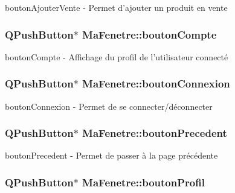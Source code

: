 bouton\-Ajouter\-Vente -\/ Permet d'ajouter un produit en vente 

\hypertarget{class_ma_fenetre_abfdb548dc88cf56eae01fd20be7b052a}{
\subsubsection[{bouton\-Compte}]{\setlength{\rightskip}{0pt plus 5cm}Q\-Push\-Button$\ast$ Ma\-Fenetre\-::bouton\-Compte\hspace{0.3cm}{\ttfamily [protected]}}}\label{class_ma_fenetre_abfdb548dc88cf56eae01fd20be7b052a}


bouton\-Compte -\/ Affichage du profil de l'utilisateur connecté 

\hypertarget{class_ma_fenetre_a6654bb6885a843d1a6ad9399eb7d0c36}{
\subsubsection[{bouton\-Connexion}]{\setlength{\rightskip}{0pt plus 5cm}Q\-Push\-Button$\ast$ Ma\-Fenetre\-::bouton\-Connexion\hspace{0.3cm}{\ttfamily [protected]}}}\label{class_ma_fenetre_a6654bb6885a843d1a6ad9399eb7d0c36}


bouton\-Connexion -\/ Permet de se connecter/déconnecter 

\hypertarget{class_ma_fenetre_a53b01801ba121b8240df4f1f8c9330b3}{
\subsubsection[{bouton\-Precedent}]{\setlength{\rightskip}{0pt plus 5cm}Q\-Push\-Button$\ast$ Ma\-Fenetre\-::bouton\-Precedent\hspace{0.3cm}{\ttfamily [protected]}}}\label{class_ma_fenetre_a53b01801ba121b8240df4f1f8c9330b3}


bouton\-Precedent -\/ Permet de passer à la page précédente 

\hypertarget{class_ma_fenetre_a406ca1016af97e007bc633efabed744b}{
\subsubsection[{bouton\-Profil}]{\setlength{\rightskip}{0pt plus 5cm}Q\-Push\-Button$\ast$ Ma\-Fenetre\-::bouton\-Profil\hspace{0.3cm}{\ttfamily [protected]}}}\label{class_ma_fenetre_a406ca1016af97e007bc633efabed744b}


